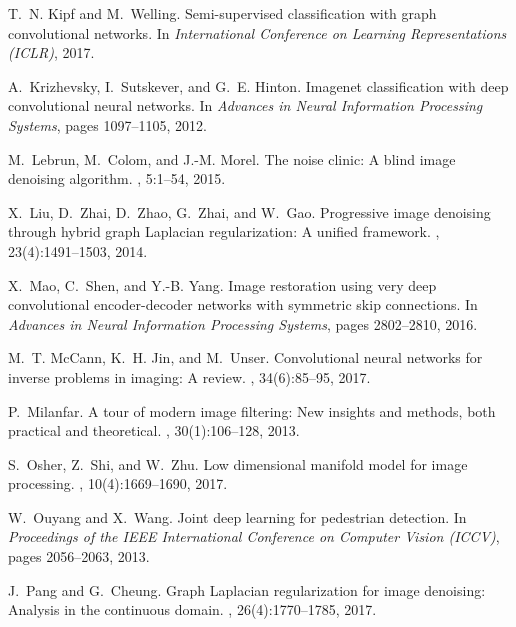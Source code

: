 \documentclass[10pt,twocolumn,letterpaper]{article}
\begin{document}
{\begin{thebibliography}{10}
T.~N. Kipf and M.~Welling.
\newblock Semi-supervised classification with graph convolutional networks.
\newblock In {\em International Conference on Learning Representations (ICLR)},
  2017.

A.~Krizhevsky, I.~Sutskever, and G.~E. Hinton.
\newblock Imagenet classification with deep convolutional neural networks.
\newblock In {\em Advances in Neural Information Processing Systems}, pages
  1097--1105, 2012.

M.~Lebrun, M.~Colom, and J.-M. Morel.
\newblock The noise clinic: {A} blind image denoising algorithm.
, 5:1--54, 2015.

X.~Liu, D.~Zhai, D.~Zhao, G.~Zhai, and W.~Gao.
\newblock Progressive image denoising through hybrid graph {L}aplacian
  regularization: {A} unified framework.
, 23(4):1491--1503, 2014.

X.~Mao, C.~Shen, and Y.-B. Yang.
\newblock Image restoration using very deep convolutional encoder-decoder
  networks with symmetric skip connections.
\newblock In {\em Advances in Neural Information Processing Systems}, pages
  2802--2810, 2016.

M.~T. McCann, K.~H. Jin, and M.~Unser.
\newblock Convolutional neural networks for inverse problems in imaging: {A}
  review.
, 34(6):85--95, 2017.

P.~Milanfar.
\newblock A tour of modern image filtering: {N}ew insights and methods, both
  practical and theoretical.
, 30(1):106--128, 2013.

S.~Osher, Z.~Shi, and W.~Zhu.
\newblock Low dimensional manifold model for image processing.
, 10(4):1669--1690, 2017.

W.~Ouyang and X.~Wang.
\newblock Joint deep learning for pedestrian detection.
\newblock In {\em Proceedings of the IEEE International Conference on Computer
  Vision (ICCV)}, pages 2056--2063, 2013.

J.~Pang and G.~Cheung.
\newblock Graph {L}aplacian regularization for image denoising: {A}nalysis in
  the continuous domain.
, 26(4):1770--1785, 2017.


\end{thebibliography}}
\end{document}
